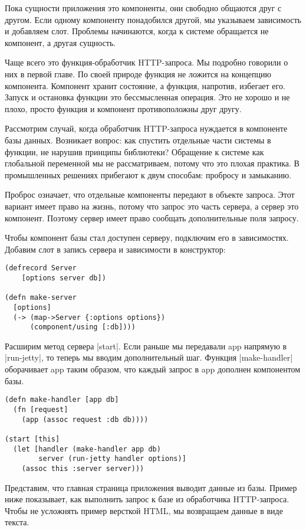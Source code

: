 Пока сущности приложения это компоненты, они свободно общаются друг с
другом. Если одному компоненту понадобился другой, мы указываем зависимость и
добавляем слот. Проблемы начинаются, когда к системе обращается не компонент, а
другая сущность.

Чаще всего это функция-обработчик HTTP-запроса. Мы подробно говорили о них в
первой главе. По своей природе функция не ложится на концепцию
компонента. Компонент хранит состояние, а функция, напротив, избегает
его. Запуск и остановка функции это бессмысленная операция. Это не хорошо и не
плохо, просто функция и компонент противоположны друг другу.

Рассмотрим случай, когда обработчик HTTP-запроса нуждается в компоненте базы
данных. Возникает вопрос: как спустить отдельные части системы в функции, не
нарушив принципы библиотеки? Обращение к системе как глобальной переменной мы не
рассматриваем, потому что это плохая практика. В промышленных решениях прибегают
к двум способам: пробросу и замыканию.

Проброс означает, что отдельные компоненты передают в объекте запроса. Этот
вариант имеет право на жизнь, потому что запрос это часть сервера, а сервер это
компонент. Поэтому сервер имеет право сообщать дополнительные поля запросу.

Чтобы компонент базы стал доступен серверу, подключим его в
зависимостях. Добавим слот в запись сервера и зависимости в конструктор:

\begin{verbatim}
(defrecord Server
    [options server db])

(defn make-server
  [options]
  (-> (map->Server {:options options})
      (component/using [:db])))
\end{verbatim}

Расширим метод сервера \spverb|start|. Если раньше мы передавали app напрямую в
\spverb|run-jetty|, то теперь мы вводим дополнительный шаг. Функция \spverb|make-handler|
оборачивает app таким образом, что каждый запрос в app дополнен компонентом
базы.

\begin{verbatim}
(defn make-handler [app db]
  (fn [request]
    (app (assoc request :db db))))

(start [this]
  (let [handler (make-handler app db)
        server (run-jetty handler options)]
    (assoc this :server server)))
\end{verbatim}

Представим, что главная страница приложения выводит данные из базы. Пример ниже
показывает, как выполнить запрос к базе из обработчика HTTP-запроса. Чтобы не
усложнять пример версткой HTML, мы возвращаем данные в виде текста.

